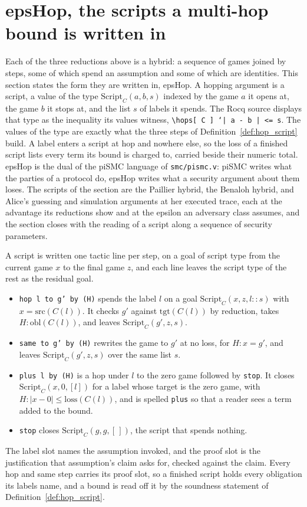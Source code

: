 \section{epsHop, the scripts a multi-hop bound is written in}

Each of the three reductions above is a hybrid: a sequence of games joined by
steps, some of which spend an assumption and some of which are identities. This
section states the form they are written in, epsHop. A hopping argument is a
script, a value of the type $\mathrm{Script}_C(a, b, s)$ indexed by the game
$a$ it opens at, the game $b$ it stops at, and the list $s$ of labels it spends.
The Rocq source displays that type as the inequality its values witness,
\texttt{\textbackslash{}hops[ C ] `| a - b | <= s}. The values of the type are
exactly what the three steps of Definition~\ref{def:hop_script} build. A label
enters a script at hop and nowhere else, so the loss of a finished script lists
every term its bound is charged to, carried beside their numeric total. epsHop is the dual of the piSMC language of
\texttt{smc/pismc.v}: piSMC writes what the parties of a protocol do, epsHop
writes what a security argument about them loses. The scripts of the section
are the Paillier hybrid, the Benaloh hybrid, and Alice's guessing and
simulation arguments at her executed trace, each at the advantage its
reductions show and at the epsilon an adversary class assumes, and the section
closes with the reading of a script along a sequence of security parameters.

A script is written one tactic line per step, on a goal of script type from the
current game $x$ to the final game $z$, and each line leaves the script type of
the rest as the residual goal.
\begin{itemize}
  \item \texttt{hop l to g' by (H)} spends the label $l$ on a goal
    $\mathrm{Script}_C(x, z, l :: s)$ with $x = \mathrm{src}(C(l))$. It checks
    $g'$ against $\mathrm{tgt}(C(l))$ by reduction, takes
    $H : \mathrm{obl}(C(l))$, and leaves $\mathrm{Script}_C(g', z, s)$.
  \item \texttt{same to g' by (H)} rewrites the game to $g'$ at no loss, for
    $H : x = g'$, and leaves $\mathrm{Script}_C(g', z, s)$ over the same list
    $s$.
  \item \texttt{plus l by (H)} is a hop under $l$ to the zero game followed by
    \texttt{stop}. It closes $\mathrm{Script}_C(x, 0, [l])$ for a label whose
    target is the zero game, with $H : \lvert x - 0 \rvert \le
    \mathrm{loss}(C(l))$, and is spelled \texttt{plus} so that a reader sees a
    term added to the bound.
  \item \texttt{stop} closes $\mathrm{Script}_C(g, g, [\,])$, the script that
    spends nothing.
\end{itemize}
The label slot names the assumption invoked, and the proof slot is the
justification that assumption's claim asks for, checked against the claim.
Every hop and same step carries its proof slot, so a finished script holds every obligation
its labels name, and a bound is read off it by the soundness statement of
Definition~\ref{def:hop_script}.


